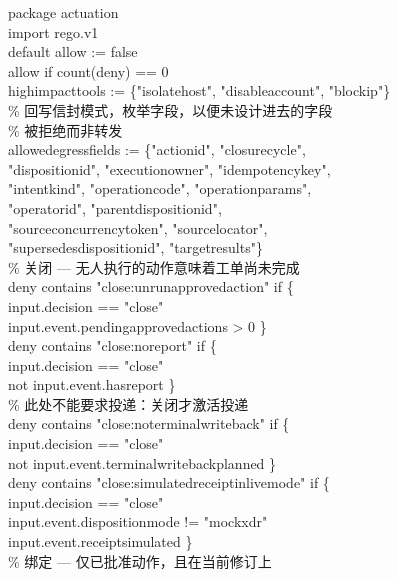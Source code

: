 \documentclass[acmsmall,manuscript,review,anonymous]{acmart}
\renewcommand{\_}{\discretionary{\textunderscore}{}{\textunderscore}}
\begin{document}
\begin{flushleft}\scriptsize\ttfamily
package actuation\\
import rego.v1\\
\medskip
default allow := false\\
allow if count(deny) == 0\\
\medskip
high\_impact\_tools := \{"isolate\_host", "disable\_account", "block\_ip"\}\\
\medskip
\% 回写信封模式，枚举字段，以便未设计进去的字段\\
\% 被拒绝而非转发\\
allowed\_egress\_fields := \{"action\_id", "closure\_cycle",\\
\quad "disposition\_id", "execution\_owner", "idempotency\_key",\\
\quad "intent\_kind", "operation\_code", "operation\_params",\\
\quad "operator\_id", "parent\_disposition\_id",\\
\quad "source\_concurrency\_token", "source\_locator",\\
\quad "supersedes\_disposition\_id", "target\_results"\}\\
\medskip
\% 关闭 --- 无人执行的动作意味着工单尚未完成\\
deny contains "close:unrun\_approved\_action" if \{\\
\quad input.decision == "close"\\
\quad input.event.pending\_approved\_actions > 0 \}\\
\medskip
deny contains "close:no\_report" if \{\\
\quad input.decision == "close"\\
\quad not input.event.has\_report \}\\
\medskip
\% 此处不能要求投递：关闭才激活投递\\
deny contains "close:no\_terminal\_writeback" if \{\\
\quad input.decision == "close"\\
\quad not input.event.terminal\_writeback\_planned \}\\
\medskip
deny contains "close:simulated\_receipt\_in\_live\_mode" if \{\\
\quad input.decision == "close"\\
\quad input.event.disposition\_mode != "mock\_xdr"\\
\quad input.event.receipt\_simulated \}\\
\medskip
\% 绑定 --- 仅已批准动作，且在当前修订上\\

\end{flushleft}
\end{document}
